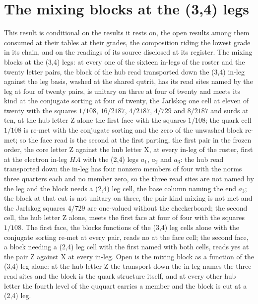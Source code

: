 \section{The mixing blocks at the (3,4) legs}\label{mod:VI-7-D541437-w-mxtf}
\begin{chwall}\label{box:VI-7-D541437-w-mxtf:1}
This result is conditional on the results it rests on, the open results among them consumed at their tables at their grades, the composition riding the lowest grade in its chain, and on the readings of its source disclosed at its register. The mixing blocks at the (3,4) legs: at every one of the sixteen in-legs of the roster and the twenty letter pairs, the block of the hub read transported down the (3,4) in-leg against the leg basis, washed at the shared qutrit, has its read sites named by the leg at four of twenty pairs, is unitary on three at four of twenty and meets its kind at the conjugate sorting at four of twenty, the Jarlskog one cell at eleven of twenty with the squares $1/108$, $16/2187$, $4/2187$, $4/729$ and $8/2187$ and surds at ten, at the hub letter Z alone the first face with the squares $1/108$; the quark cell $1/108$ is re-met with the conjugate sorting and the zero of the unwashed block re-met; so the face read is the second at the first parting, the first pair in the frozen order, the core letter Z against the hub letter X, at every in-leg of the roster, first at the electron in-leg $HA$ with the (2,4) legs $a_{1}$, $a_{2}$ and $a_{3}$: the hub read transported down the in-leg has four nonzero members of four with the norms three quarters each and no member zero, so the three read sites are not named by the leg and the block needs a (2,4) leg cell, the base column naming the end $a_{3}$; the block at that cut is not unitary on three, the pair kind mixing is not met and the Jarlskog squares $4/729$ are one-valued without the checkerboard; the second cell, the hub letter Z alone, meets the first face at four of four with the squares $1/108$.
The first face, the blocks functions of the (3,4) leg cells alone with the conjugate sorting re-met at every pair, reads no at the face cell; the second face, a block needing a (2,4) leg cell with the first named with both cells, reads yes at the pair Z against X at every in-leg. Open is the mixing block as a function of the (3,4) leg alone: at the hub letter Z the transport down the in-leg names the three read sites and the block is the quark structure itself, and at every other hub letter the fourth level of the ququart carries a member and the block is cut at a (2,4) leg.
\end{chwall}
